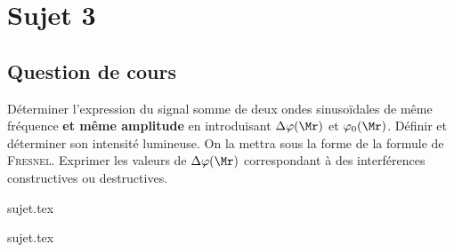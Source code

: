 \documentclass[a4paper, 11pt]{book}
\begin{document}
\chapter{Sujet 3}
\section{Question de cours}
Déterminer l'expression du signal somme de deux ondes sinusoïdales de
même fréquence \textbf{et même amplitude} en introduisant $\Delta
\varphi(\Mr)$ et $\varphi_0(\Mr)$. Définir et déterminer son intensité lumineuse.
On la mettra sous la forme de la formule de \textsc{Fresnel}. Exprimer
les valeurs de $\Delta\varphi(\Mr)$ correspondant à des interférences
constructives ou destructives.

\resetQ
{sujet.tex}

\resetQ
{sujet.tex}


\label{LastPage}
\end{document}
